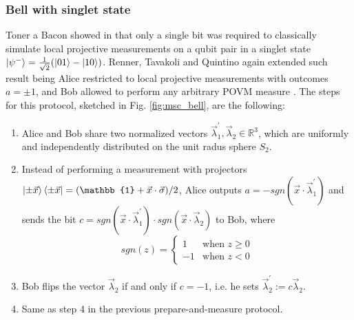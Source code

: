 \subsubsection{Bell with singlet state}\label{section:protocol_bell}
Toner a Bacon showed in \cite{toner2003} that only a single bit was required to classically simulate local projective measurements on a qubit pair in a singlet state $\ket{\psi^{-}}=\frac{1}{\sqrt{2}}(\ket{01} - \ket{10})$. Renner, Tavakoli and Quintino again extended such result being Alice restricted to local projective measurements with outcomes $a=\pm 1$, and Bob allowed to perform any arbitrary POVM measure \cite{renner2022}. The steps for this protocol, sketched in Fig. \ref{fig:msc_bell}, are the following:
\begin{enumerate}
 \item Alice and Bob share two normalized vectors $\vec{\lambda}_1^{\prime}, \vec{\lambda}_2 \in \mathbb{R}^{3}$, which are uniformly and independently distributed on the unit radus sphere $S_2$.
 \item Instead of performing a measurement with projectors $\ket{\pm\vec{x}}\bra{\pm\vec{x}} = (\mathbb{1} + \vec{x} \cdot \vec{\sigma})/2$, Alice outputs $a = -sgn(\vec{x} \cdot \vec{\lambda}^{\prime}_1)$ and sends the bit $c = sgn(\vec{x} \cdot \vec{\lambda}^{\prime}_1) \cdot sgn(\vec{x} \cdot \vec{\lambda}_2)$ to Bob, where 
 \begin{equation}
sgn(z) =
    \begin{cases}
      1 & \text{when $z \ge 0$}\\
      -1 & \text{when $z<0$}
    \end{cases} 
\end{equation}
 \item Bob flips the vector $\vec{\lambda}_2$ if and only if $c=-1$, i.e. he sets $\vec{\lambda}^{\prime}_{2} := c \vec{\lambda}_{2}$.
 \item Same as step 4 in the previous prepare-and-measure protocol.
\end{enumerate}

